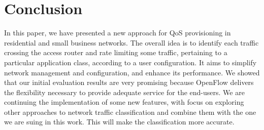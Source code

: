 \section{Conclusion}
In this paper, we have presented  a new approach for QoS provisioning in residential and small business networks. The overall idea is to identify each traffic crossing the access router and rate limiting some traffic, pertaining to a particular application class, according to a user configuration. It aims to simplify network management and configuration, and enhance its performance. 
We showed that our initial evaluation results are very promising because  OpenFlow delivers the flexibility necessary to provide adequate service for the end-users.  We are continuing the implementation of some new features, with focus on exploring other approaches to network traffic classification and combine them with the one we are suing in this work. This will make the classification more accurate.
